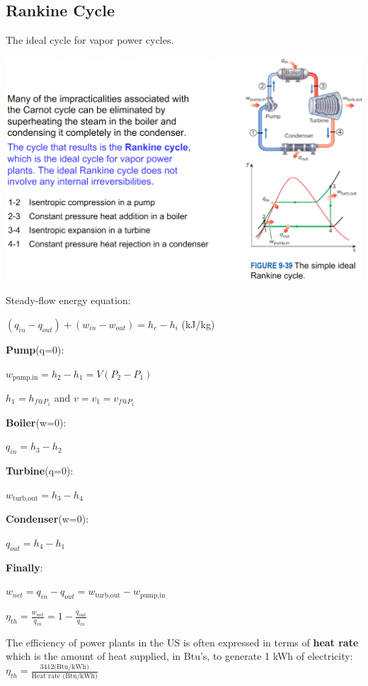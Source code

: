 \documentclass{article}
\begin{document}
\begin{multicols}{3}
    \subsection*{Rankine Cycle}
    The ideal cycle for vapor power cycles.\par
    \includegraphics[width=\linewidth]{Images/Rankine_Cycle.png}\par 
    Steady-flow energy equation:\par 
    $(q_{in}-q_{out})+(w_{in}-w_{out})=h_e-h_i$ (kJ/kg)\par 
    \textbf{Pump}(q=0):\par 
    $w_\text{pump,in}=h_2-h_1=V(P_2-P_1)$\par 
    $h_1=h_{f@P_1}$ and $v=v_1=v_{f@P_1}$\par 
    \textbf{Boiler}(w=0):\par $q_{in}=h_3-h_2$\par 
    \textbf{Turbine}(q=0):\par $w_\text{turb,out}=h_3-h_4$\par 
    \textbf{Condenser}(w=0):\par $q_{out}=h_4-h_1$\par 
    \textbf{Finally}:\par 
    $w_{net}=q_{in}-q_{out}=w_\text{turb,out}-w_\text{pump,in}$\par 
    $\eta_{th}=\frac{w_{net}}{q_{in}}=1-\frac{q_{out}}{q_{in}}$\par 
    The efficiency of power plants in the US is often expressed in terms of \textbf{heat rate} which is the amount of heat supplied, in Btu's, to generate 1 kWh of electricity: $\eta_{th}=\frac{3412\text{(Btu/kWh)}}{\text{Heat rate (Btu/kWh)}}$

\end{multicols}
\end{document}
